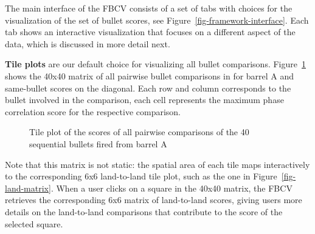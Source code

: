\documentclass[
  12pt]{article}
\begin{document}
The main interface of the FBCV consists of a set of tabs with choices
for the visualization of the set of bullet scores, see
Figure~\ref{fig-framework-interface}. Each tab shows an interactive
visualization that focuses on a different aspect of the data, which is
discussed in more detail next. \hfill\newline

\textbf{Tile plots} are our default choice for visualizing all bullet
comparisons. Figure~\ref{fig-barrel-matrix} shows the 40x40 matrix of
all pairwise bullet comparisons in for barrel A and same-bullet scores
on the diagonal. Each row and column corresponds to the bullet involved
in the comparison, each cell represents the maximum phase correlation
score for the respective comparison.

\begin{figure}


\caption{\label{fig-barrel-matrix}Tile plot of the scores of all
pairwise comparisons of the 40 sequential bullets fired from barrel A}

\end{figure}%

Note that this matrix is not static: the spatial area of each tile maps
interactively to the corresponding 6x6 land-to-land tile plot, such as
the one in Figure~\ref{fig-land-matrix}. When a user clicks on a square
in the 40x40 matrix, the FBCV retrieves the corresponding 6x6 matrix of
land-to-land scores, giving users more details on the land-to-land
comparisons that contribute to the score of the selected square.
\end{document}
